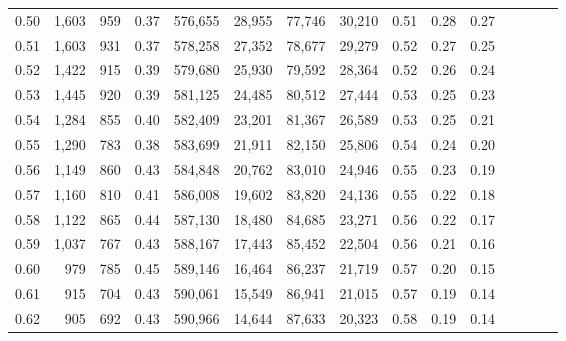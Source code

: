 \begin{tabular}{rrrcrrrrrrrrrrr}
0.50 &   1,603 &    959 &                                       0.37 &  576,655 &   28,955 &   77,746 &   30,210 &  0.51 &  0.28 &                         0.27 \\
0.51 &   1,603 &    931 &                                       0.37 &  578,258 &   27,352 &   78,677 &   29,279 &  0.52 &  0.27 &                         0.25 \\
0.52 &   1,422 &    915 &                                       0.39 &  579,680 &   25,930 &   79,592 &   28,364 &  0.52 &  0.26 &                         0.24 \\
0.53 &   1,445 &    920 &                                       0.39 &  581,125 &   24,485 &   80,512 &   27,444 &  0.53 &  0.25 &                         0.23 \\
0.54 &   1,284 &    855 &                                       0.40 &  582,409 &   23,201 &   81,367 &   26,589 &  0.53 &  0.25 &                         0.21 \\
0.55 &   1,290 &    783 &                                       0.38 &  583,699 &   21,911 &   82,150 &   25,806 &  0.54 &  0.24 &                         0.20 \\
0.56 &   1,149 &    860 &                                       0.43 &  584,848 &   20,762 &   83,010 &   24,946 &  0.55 &  0.23 &                         0.19 \\
0.57 &   1,160 &    810 &                                       0.41 &  586,008 &   19,602 &   83,820 &   24,136 &  0.55 &  0.22 &                         0.18 \\
0.58 &   1,122 &    865 &                                       0.44 &  587,130 &   18,480 &   84,685 &   23,271 &  0.56 &  0.22 &                         0.17 \\
0.59 &   1,037 &    767 &                                       0.43 &  588,167 &   17,443 &   85,452 &   22,504 &  0.56 &  0.21 &                         0.16 \\
0.60 &     979 &    785 &                                       0.45 &  589,146 &   16,464 &   86,237 &   21,719 &  0.57 &  0.20 &                         0.15 \\
0.61 &     915 &    704 &                                       0.43 &  590,061 &   15,549 &   86,941 &   21,015 &  0.57 &  0.19 &                         0.14 \\
0.62 &     905 &    692 &                                       0.43 &  590,966 &   14,644 &   87,633 &   20,323 &  0.58 &  0.19 &                         0.14 \\

\end{tabular}
